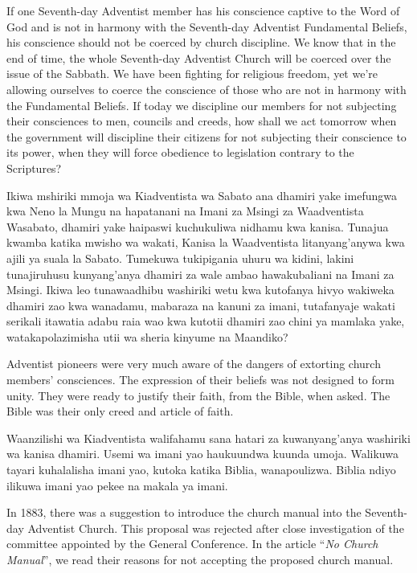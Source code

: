 If one Seventh-day Adventist member has his conscience captive to the Word of God and is not in harmony with the Seventh-day Adventist Fundamental Beliefs, his conscience should not be coerced by church discipline. We know that in the end of time, the whole Seventh-day Adventist Church will be coerced over the issue of the Sabbath. We have been fighting for religious freedom, yet we’re allowing ourselves to coerce the conscience of those who are not in harmony with the Fundamental Beliefs. If today we discipline our members for not subjecting their consciences to men, councils and creeds, how shall we act tomorrow when the government will discipline their citizens for not subjecting their conscience to its power, when they will force obedience to legislation contrary to the Scriptures?


Ikiwa mshiriki mmoja wa Kiadventista wa Sabato ana dhamiri yake imefungwa kwa Neno la Mungu na hapatanani na Imani za Msingi za Waadventista Wasabato, dhamiri yake haipaswi kuchukuliwa nidhamu kwa kanisa. Tunajua kwamba katika mwisho wa wakati, Kanisa la Waadventista litanyang'anywa kwa ajili ya suala la Sabato. Tumekuwa tukipigania uhuru wa kidini, lakini tunajiruhusu kunyang'anya dhamiri za wale ambao hawakubaliani na Imani za Msingi. Ikiwa leo tunawaadhibu washiriki wetu kwa kutofanya hivyo wakiweka dhamiri zao kwa wanadamu, mabaraza na kanuni za imani, tutafanyaje wakati serikali itawatia adabu raia wao kwa kutotii dhamiri zao chini ya mamlaka yake, watakapolazimisha utii wa sheria kinyume na Maandiko?


Adventist pioneers were very much aware of the dangers of extorting church members’ consciences. The expression of their beliefs was not designed to form unity. They were ready to justify their faith, from the Bible, when asked. The Bible was their only creed and article of faith.


Waanzilishi wa Kiadventista walifahamu sana hatari za kuwanyang'anya washiriki wa kanisa dhamiri. Usemi wa imani yao haukuundwa kuunda umoja. Walikuwa tayari kuhalalisha imani yao, kutoka katika Biblia, wanapoulizwa. Biblia ndiyo ilikuwa imani yao pekee na makala ya imani.


In 1883, there was a suggestion to introduce the church manual into the Seventh-day Adventist Church. This proposal was rejected after close investigation of the committee appointed by the General Conference. In the article “\textit{No Church Manual}”, we read their reasons for not accepting the proposed church manual.


